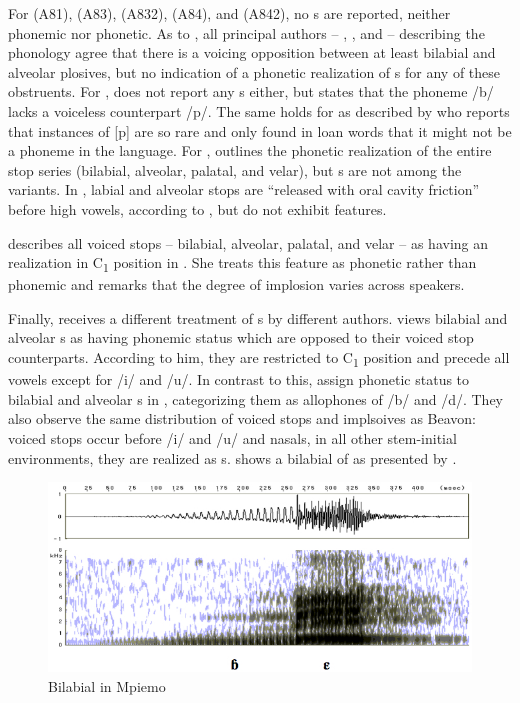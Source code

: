 \documentclass[output=paper]{LSP/langsci}
\begin{document}
For  (A81),  (A83),  (A832),  (A84), and  (A842), no s are reported, neither phonemic nor phonetic.   As to , all principal authors -- \citet{Lemb1974}, \citet{Dieu1976}, and \citet{Yemmene2004} -- describing the phonology agree that there is a voicing opposition between at least bilabial and alveolar plosives, but no indication of a phonetic realization of s for any of these obstruents.  For , \citet{Heath2003} does not report any s either, but states that the phoneme /b/ lacks a voiceless counterpart /p/. The same holds for  as described by \citet{Henson2007} who reports that instances of [p] are so rare and only found in loan words that it might not be a phoneme in the language. For , \citet{Beavon2006} outlines the phonetic realization of the entire stop series (bilabial, alveolar, palatal, and velar), but s are not among the variants. In , labial and alveolar stops are ``released with oral cavity friction'' before high vowels, according to \citet[134]{Beavon1983}, but do not exhibit  features.


\citet[147]{Cheucle2014} describes all voiced stops -- bilabial, alveolar, palatal, and velar -- as having an  realization in C\textsubscript{1} position in . She treats this feature as phonetic rather than phonemic and remarks that the degree of implosion varies across speakers.

Finally,  receives a different treatment of s by different authors.  \citet{Beavon1978} views bilabial and alveolar s as having phonemic status which are opposed to their voiced stop counterparts. According to him, they are restricted to C\textsubscript{1} position and precede all vowels except for /i/ and /u/. In contrast to this, \citet{Thornell2004} assign phonetic status to bilabial and alveolar s in , categorizing them as allophones of /b/ and /d/. They also observe the same distribution of voiced stops and implsoives as Beavon: voiced stops occur before /i/ and /u/ and nasals, in all other stem-initial environments, they are realized as s.  shows a bilabial  of  as presented by \citet[172]{Thornell2004}.

\begin{figure}
\caption{Bilabial  in Mpiemo} 
\label{fig:grimm:1}
\includegraphics[width=\textwidth]{figures/mpiemoB.jpg}
\end{figure}
\end{document}
